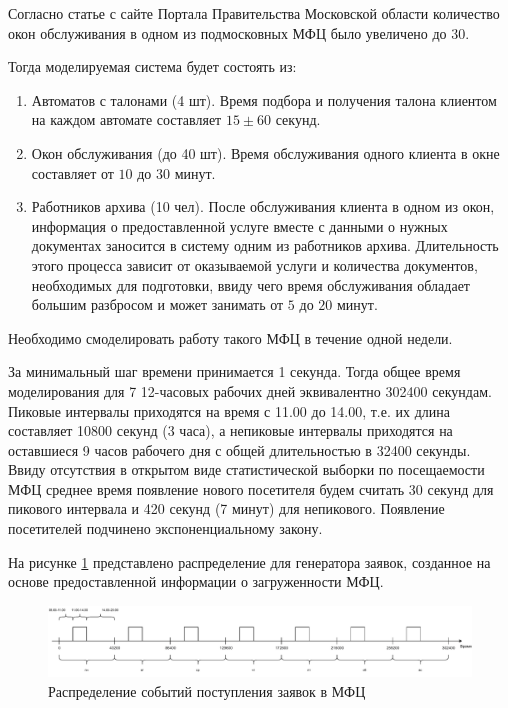 Согласно статье с сайте Портала Правительства Московской области \cite{mosreg_ru} количество окон обслуживания в одном из подмосковных МФЦ было увеличено до 30.

Тогда моделируемая система будет состоять из:
\begin{enumerate}
	\item Автоматов с талонами (4 шт). Время подбора и получения талона клиентом на каждом автомате составляет $15\pm60$ секунд.
	\item Окон обслуживания (до 40 шт). Время обслуживания одного клиента в окне составляет от $10$  до $30$ минут.
	\item Работников архива (10 чел). После обслуживания клиента в одном из окон, информация о предоставленной услуге вместе с данными о нужных документах заносится в систему одним из работников архива. Длительность этого процесса зависит от оказываемой услуги и количества документов, необходимых для подготовки, ввиду чего время обслуживания обладает большим разбросом и может занимать от $5$ до $20$ минут.
\end{enumerate}

Необходимо смоделировать работу такого МФЦ в течение одной недели.


За минимальный шаг времени принимается 1 секунда. Тогда общее время моделирования для 7 12-часовых рабочих дней эквивалентно 302400 секундам. Пиковые интервалы приходятся на время с 11.00 до 14.00, т.е. их длина составляет 10800 секунд (3 часа), а непиковые интервалы приходятся на оставшиеся 9 часов рабочего дня с общей длительностью в 32400 секунды. Ввиду отсутствия в открытом виде статистической выборки по посещаемости МФЦ среднее время появление нового посетителя будем считать 30 секунд для пикового интервала и 420 секунд (7 минут) для непикового. Появление посетителей подчинено экспоненциальному закону.

На рисунке \ref{img:system_modelling_distr}	 представлено распределение для генератора заявок, созданное на основе предоставленной информации о загруженности МФЦ.

\begin{figure}[h!btp]
	\centering
	\includegraphics[width=1\columnwidth]{inc/img/system_modelling_distr.pdf}
	\caption{Распределение событий поступления заявок в МФЦ}
	\label{img:system_modelling_distr}	
\end{figure}

